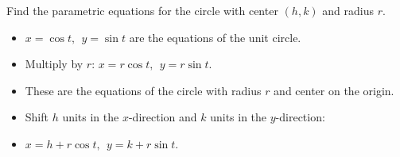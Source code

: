 \begin{frame}
\begin{example}[Example 4, p. 659]
Find the parametric equations for the circle with center $(h, k)$ and radius $r$.
\begin{itemize}
\item<2->  $x = \cos t,\ \  y = \sin t$ are the equations of the unit circle.
\item<3->  Multiply by $r$: $x = r\cos t,\ \  y = r\sin t$.
\item<4->  These are the equations of the circle with radius $r$ and center on the origin.
\item<5->  Shift $h$ units in the $x$-direction and $k$ units in the $y$-direction:
\item<5->  $x = h + r\cos t,\ \  y = k+ r\sin t$.
\end{itemize}
\end{example}
\end{frame}
